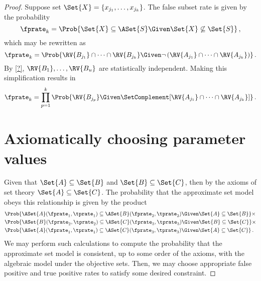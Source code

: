 \begin{proof}
    
    Suppose set $\Set{X} = \{x_{j_1},\ldots,x_{j_k}\}$. The false 
    subset rate is given by the probability
    \begin{equation}
    \fprate_k = \Prob{\Set{X} \subseteq \ASet{S} \Given 
        \Set{X} \not\subseteq \Set{S}}\,,
    \end{equation}
    which may be rewritten as
    \begin{equation}
    \fprate_k = \Prob{\RV{B_{j_1}} \cap \cdots \cap \RV{B_{j_k}}
        \Given \neg \left(\RV{A_{j_1}} \cap \cdots \cap 
        \RV{A_{j_k}}\right)}\,.
    \end{equation}
    By \cref{?}, $\RV{B_1},\ldots,\RV{B_u}$ are statistically 
    independent. Making this simplification results in
    \begin{equation}
    \fprate_k = \prod_{p=1}^{k} \Prob{\RV{B_{j_p}} \Given 
        \SetComplement[\RV{A_{j_1}} \cap \cdots \cap \RV{A_{j_k}}]}\,.
    \end{equation}
























    \chapter{Axiomatically choosing parameter values}
Given that $\Set{A} \subseteq \Set{B}$ and $\Set{B} \subseteq \Set{C}$, then by 
the axioms of set theory $\Set{A} \subseteq \Set{C}$. The probability that the 
approximate set model obeys this relationship is given by the product
\begin{equation}
\begin{split}
&\Prob{\ASet{A}(\fprate_1,\tprate_1) \subseteq 
    \ASet{B}(\fprate_2,\tprate_2) \Given \Set{A} \subseteq \Set{B}} \times\\
&\Prob{\ASet{B}(\fprate_2,\tprate_2) \subseteq 
    \ASet{C}(\fprate_3,\tprate_3) \Given \Set{B} \subseteq \Set{C}} \times\\
&\Prob{\ASet{A}(\fprate_1,\tprate_1) \subseteq 
    \ASet{C}(\fprate_3,\tprate_3) \Given \Set{A} \subseteq \Set{C}}\,.
\end{split}
\end{equation}
We may perform such calculations to compute the probability that 
the approximate set model is consistent, up to some order of the axioms, with 
the algebraic model under the objective sets. Then, we may choose appropriate 
false positive and true positive rates to satisfy some desired constraint.



\end{proof}
